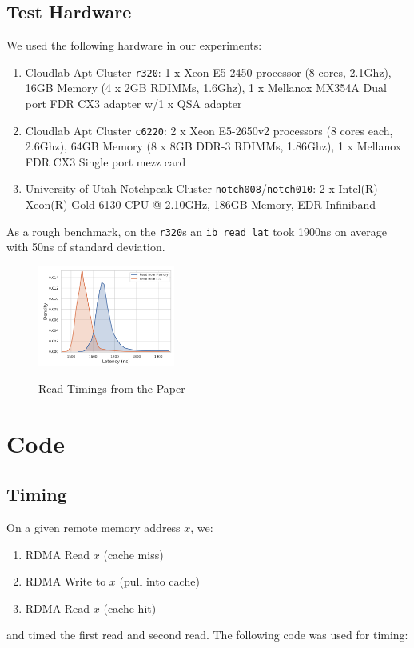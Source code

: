 \documentclass[twocolumn]{article}
\begin{document}
\subsection{Test Hardware}
We used the following hardware in our experiments:
\begin{enumerate}
 \item Cloudlab Apt Cluster \texttt{r320}: 1 x Xeon E5-2450 processor (8 cores, 2.1Ghz), 16GB Memory (4 x 2GB RDIMMs, 1.6Ghz), 1 x Mellanox MX354A Dual port FDR CX3 adapter w/1 x QSA adapter
 \item Cloudlab Apt Cluster \texttt{c6220}: 2 x Xeon E5-2650v2 processors (8 cores each, 2.6Ghz), 64GB Memory (8 x 8GB DDR-3 RDIMMs, 1.86Ghz), 1 x Mellanox FDR CX3 Single port mezz card
 \item University of Utah Notchpeak Cluster \texttt{notch008}/\texttt{notch010}: 2 x Intel(R) Xeon(R) Gold 6130 CPU @ 2.10GHz, 186GB Memory, EDR Infiniband
\end{enumerate}
As a rough benchmark, on the \texttt{r320}s an \texttt{ib\_read\_lat} took 1900ns on average with 50ns of standard deviation.

\begin{figure}
 \centering
 \includegraphics[width=0.40\textwidth]{replication_graph.png}
 \label{fig:replication_graph}
 \caption{Read Timings from the Paper}
\end{figure}

\section{Code}
\subsection{Timing}
On a given remote memory address $x$, we:
\begin{enumerate}
 \item RDMA Read $x$ (cache miss)
 \item RDMA Write to $x$ (pull into cache)
 \item RDMA Read $x$ (cache hit)
\end{enumerate}
and timed the first read and second read.
The following code was used for timing:
\end{document}
